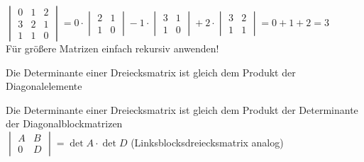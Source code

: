 \documentclass[a4paper,twocolumn]{article}
\begin{document}
	\begin{fmerke}
		$\begin{vmatrix}
			0 & 1 & 2 \\
			3 & 2 & 1 \\
			1 & 1 & 0
		\end{vmatrix}
			=
		0 \cdot
		\begin{vmatrix}
			2 & 1 \\
			1 & 0
		\end{vmatrix}
			-1 \cdot
		\begin{vmatrix}
			3 & 1 \\
			1 & 0
		\end{vmatrix}
			+2 \cdot
		\begin{vmatrix}
			3 & 2 \\
			1 & 1
		\end{vmatrix}
			= 0 + 1 + 2
		= 3$\\[1mm]
		Für größere Matrizen einfach rekursiv anwenden!
	\end{fmerke}
	
	\begin{fmerke}
		Die Determinante einer Dreiecksmatrix ist gleich dem Produkt der Diagonalelemente
	\end{fmerke}

	\begin{fmerke}
		Die Determinante einer Dreiecksmatrix ist gleich dem Produkt der Determinante der Diagonalblockmatrizen\\
		$\begin{vmatrix}
			A & B \\
			0 & D
		\end{vmatrix} = \det{A} \cdot \det{D}$ (Linksblocksdreiecksmatrix analog)
	\end{fmerke}
\end{document}
